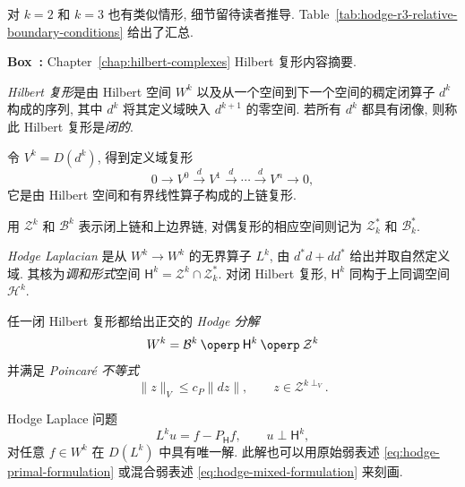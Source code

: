 对 $k=2$ 和 $k=3$ 也有类似情形, 细节留待读者推导. Table~\ref{tab:hodge-r3-relative-boundary-conditions} 给出了汇总.
\newpage
\begin{MBSourceBox}
\label{box:hilbert-complexes-summary}
\noindent\textbf{Box~\thebooksummary:} {Chapter~\ref{chap:hilbert-complexes} Hilbert 复形内容摘要.}\par

\emph{Hilbert 复形}是由 Hilbert 空间 $W^k$ 以及从一个空间到下一个空间的稠定闭算子 $d^k$ 构成的序列, 其中 $d^k$ 将其定义域映入 $d^{k+1}$ 的零空间. 若所有 $d^k$ 都具有闭像, 则称此 Hilbert 复形是\emph{闭的}.

令 $V^k=D(d^k)$, 得到定义域复形
\[
0\to V^0\xrightarrow{d}V^1\xrightarrow{d}\cdots\xrightarrow{d}V^n\to0,
\]
它是由 Hilbert 空间和有界线性算子构成的上链复形.

用 $\mathcal Z^k$ 和 $\mathcal B^k$ 表示闭上链和上边界链, 对偶复形的相应空间则记为 $\mathcal Z_k^*$ 和 $\mathcal B_k^*$.

\emph{Hodge Laplacian} 是从 $W^k\to W^k$ 的无界算子 $L^k$, 由 $d^*d+dd^*$ 给出并取自然定义域. 其核为\emph{调和形式}空间 $\mathsf H^k=\mathcal Z^k\cap\mathcal Z_k^*$. 对闭 Hilbert 复形, $\mathsf H^k$ 同构于上同调空间 $\mathcal H^k$.

任一闭 Hilbert 复形都给出正交的 \emph{Hodge 分解}
\[
W^k=\mathcal B^k\BookOrthSum\mathsf H^k\BookOrthSum\mathcal Z^k
\]
并满足 \emph{Poincaré 不等式}
\[
\|z\|_V\leq c_P\|dz\|,\qquad z\in\mathcal Z^{k\perp_V}.
\]

Hodge Laplace 问题
\[
L^ku=f-P_{\mathsf H}f,\qquad u\perp\mathsf H^k,
\]
对任意 $f\in W^k$ 在 $D(L^k)$ 中具有唯一解. 此解也可以用原始弱表述 \eqref{eq:hodge-primal-formulation} 或混合弱表述 \eqref{eq:hodge-mixed-formulation} 来刻画.
\end{MBSourceBox}

